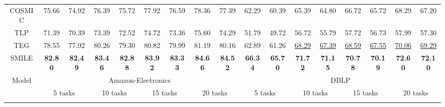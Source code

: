 \begin{table*}[ht]
{\begin{tabular}{@{}c|cccccccc|cccccccc@{}}
COSMIC                   & 75.66    & 74.92    & 76.39    & 75.72    & 77.92    & 76.59    & 78.36    & 77.39    & 62.29          & 60.39          & 65.39          & 64.80          & 66.72    & 65.72    & 68.29    & 67.20
\\
TLP                   & 71.39    & 70.39    & 73.39    & 72.52    & 74.72    & 73.36    & 75.60    & 74.29    & 51.79          & 49.72          & 56.72          & 55.79          & 57.72    & 56.73    & 57.99    & 57.30
\\ 
TEG                   & 78.55    & 77.92    & 80.26    & 79.30    & 80.82    & 79.99    & 81.19    & 80.16    & 62.89          & 61.26          & \underline{68.29}          & \underline{67.39}          & \underline{68.59}    & \underline{67.55}    & \underline{70.06}    & \underline{69.29}
\\ \midrule
SMILE                   & \textbf{82.80} & \textbf{82.49} & \textbf{83.46} & \textbf{82.88} & \textbf{83.92} & \textbf{83.33} & \textbf{84.66} & \textbf{84.52} & \textbf{66.34} & \textbf{65.70} & \textbf{71.72} & \textbf{71.15} & \textbf{70.78} & \textbf{70.19} & \textbf{72.60} & \textbf{72.10} \\ \midrule
\multirow{3}{*}{Model} & \multicolumn{8}{c|}{Amazon-Electronics}                                                                                               & \multicolumn{8}{c}{DBLP}                                                                                                              \\ \cmidrule(l){2-17} 
                       & \multicolumn{2}{c}{5 tasks}     & \multicolumn{2}{c}{10 tasks}    & \multicolumn{2}{c}{15 tasks}    & \multicolumn{2}{c|}{20 tasks}   & \multicolumn{2}{c}{5 tasks}     & \multicolumn{2}{c}{10 tasks}    & \multicolumn{2}{c}{15 tasks}    & \multicolumn{2}{c}{20 tasks}    \\ \cmidrule(l){2-17} 

\end{tabular}}
\end{table*}
